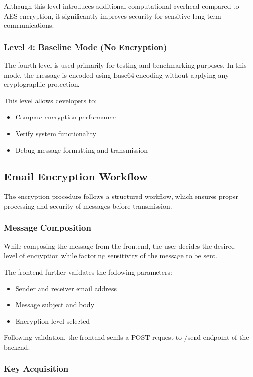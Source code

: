\documentclass[conference]{IEEEtran}
\begin{document}
Although this level introduces additional computational overhead compared to AES encryption, it significantly improves security for sensitive long-term communications.

\subsubsection{Level 4: Baseline Mode (No Encryption)}

The fourth level is used primarily for testing and benchmarking purposes. In this mode, the message is encoded using Base64 encoding without applying any cryptographic protection.

This level allows developers to:
\begin{itemize}
    \item Compare encryption performance
    \item Verify system functionality
    \item Debug message formatting and transmission
\end{itemize}

\subsection{Email Encryption Workflow}

The encryption procedure follows a structured workflow, which ensures proper processing and security of messages before transmission.

\subsubsection{Message Composition}

While composing the message from the frontend, the user decides the desired level of encryption while factoring sensitivity of the message to be sent.

The frontend further validates the following parameters:
\begin{itemize}
\item
  Sender and receiver email address
\item
  Message subject and body
\item
  Encryption level selected
\end{itemize}

Following validation, the frontend sends a POST request to /send endpoint of the backend.

\subsubsection{Key Acquisition}
\end{document}
